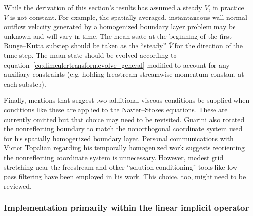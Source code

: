 \documentclass[letterpaper,11pt,nointlimits,reqno,draft]{amsbook}
\begin{document}
While the derivation of this section's results has assumed a steady $\bar{V}$,
in practice $\bar{V}$ is not constant.  For example, the spatially averaged,
instantaneous wall-normal outflow velocity generated by a homogenized boundary
layer problem may be unknown and will vary in time.  The mean state at the
beginning of the first Runge--Kutta substep should be taken as the ``steady''
$\bar{V}$ for the direction of the time step.  The mean state should be evolved
according to equation~\eqref{eq:dimeulertransformevolve_general} modified to
account for any auxiliary constraints (e.g. holding freestream streamwise
momentum constant at each substep).

Finally, \citet{Guarini1998} mentions that \citet{Poinsot1992Boundary}
suggest two additional viscous conditions be supplied when conditions like
these are applied to the Navier--Stokes equations.  These are currently omitted
but that choice may need to be revisited.  Guarini also rotated the
nonreflecting boundary to match the nonorthogonal coordinate system used for
his spatially homogenized boundary layer.  Personal communications with Victor
Topalian regarding his temporally homogenized work suggests reorienting the
nonreflecting coordinate system is unnecessary.  However, modest grid
stretching near the freestream and other ``solution conditioning'' tools like
low pass filtering have been employed in his work.  This choice, too, might
need to be reviewed.

\subsubsection{Implementation primarily within the linear implicit operator}
\end{document}
